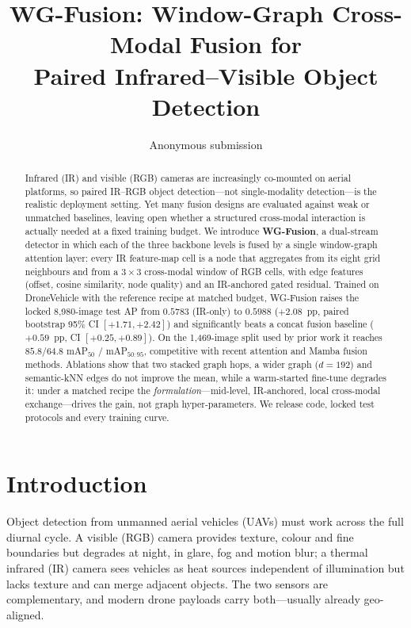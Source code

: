 \documentclass[10pt,twocolumn,letterpaper]{article}
\title{WG-Fusion: Window-Graph Cross-Modal Fusion for\\Paired Infrared--Visible Object Detection}
\author{Anonymous submission}
\begin{document}
\maketitle

\begin{abstract}
Infrared (IR) and visible (RGB) cameras are increasingly co-mounted on aerial
platforms, so paired IR--RGB object detection---not single-modality
detection---is the realistic deployment setting. Yet many fusion designs are
evaluated against weak or unmatched baselines, leaving open whether a
structured cross-modal interaction is actually needed at a fixed training
budget. We introduce \textbf{WG-Fusion}, a dual-stream detector in which each
of the three backbone levels is fused by a single window-graph attention layer:
every IR feature-map cell is a node that aggregates from its eight grid
neighbours and from a $3\times3$ cross-modal window of RGB cells, with edge
features (offset, cosine similarity, node quality) and an IR-anchored gated
residual. Trained on DroneVehicle with the reference recipe at matched budget,
WG-Fusion raises the locked 8,980-image test AP from $0.5783$ (IR-only) to
$\mathbf{0.5988}$ ($+2.08$~pp, paired bootstrap 95\% CI $[+1.71,+2.42]$) and
significantly beats a concat fusion baseline ($+0.59$~pp, CI $[+0.25,+0.89]$).
On the 1,469-image split used by prior work it reaches $85.8$/$64.8$ mAP$_{50}$
/ mAP$_{50{:}95}$, competitive with recent attention and Mamba fusion methods.
Ablations show that two stacked graph hops, a wider graph ($d{=}192$) and
semantic-kNN edges do not improve the mean, while a warm-started fine-tune
degrades it: under a matched recipe the \emph{formulation}---mid-level,
IR-anchored, local cross-modal exchange---drives the gain, not graph
hyper-parameters. We release code, locked test protocols and every training
curve.
\end{abstract}

\section{Introduction}

Object detection from unmanned aerial vehicles (UAVs) must work across the full
diurnal cycle. A visible (RGB) camera provides texture, colour and fine
boundaries but degrades at night, in glare, fog and motion blur; a thermal
infrared (IR) camera sees vehicles as heat sources independent of illumination
but lacks texture and can merge adjacent objects. The two sensors are
complementary, and modern drone payloads carry both---usually already
geo-aligned.
\end{document}
